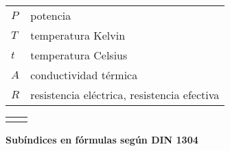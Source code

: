 \begin{mytable}[H]
\begin{tabular}{ll}
		$P$ & potencia \\
		$T$ & temperatura Kelvin \\
		$t$ & temperatura Celsius \\
		$A$ & conductividad térmica \\
		$R$ & resistencia eléctrica, resistencia efectiva \\
	\end{tabular}
\end{mytable}


\begin{mytable}[H]
	\centering
	\begin{tabular}{ll}
		\multicolumn{1}{c}{\quad\quad\quad} & \multicolumn{1}{c}{} \\
	\end{tabular}
\end{mytable}

\begin{center}
	\textbf{Subíndices en fórmulas según DIN 1304}
\end{center}


